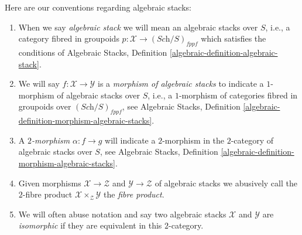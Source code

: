 \medskip\noindent
Here are our conventions regarding algebraic stacks:
\begin{enumerate}
\item When we say {\it algebraic stack} we will mean an algebraic
stacks over $S$, i.e., a category fibred in groupoids
$p : \mathcal{X} \to (\textit{Sch}/S)_{fppf}$
which satisfies the conditions of
Algebraic Stacks, Definition \ref{algebraic-definition-algebraic-stack}.
\item We will say $f : \mathcal{X} \to \mathcal{Y}$ is a
{\it morphism of algebraic stacks} to indicate a $1$-morphism
of algebraic stacks over $S$, i.e., a $1$-morphism of categories fibred
in groupoids over $(\textit{Sch}/S)_{fppf}$, see
Algebraic Stacks,
Definition \ref{algebraic-definition-morphism-algebraic-stacks}.
\item A {\it $2$-morphism} $\alpha : f \to g$ will
indicate a $2$-morphism in the $2$-category of algebraic stacks over
$S$, see
Algebraic Stacks,
Definition \ref{algebraic-definition-morphism-algebraic-stacks}.
\item Given morphisms $\mathcal{X} \to \mathcal{Z}$
and $\mathcal{Y} \to \mathcal{Z}$ of algebraic stacks
we abusively call the $2$-fibre product
$\mathcal{X} \times_{\mathcal{Z}} \mathcal{Y}$ the {\it fibre product}.
\item We will often abuse notation and say two algebraic stacks
$\mathcal{X}$ and $\mathcal{Y}$ are {\it isomorphic} if they are
equivalent in this $2$-category.
\end{enumerate}

